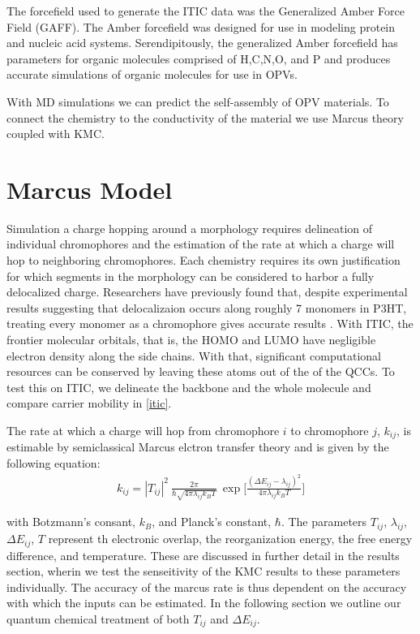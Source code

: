 The forcefield used to generate the ITIC data was the Generalized
Amber Force Field (GAFF)\cite{Wang2004a}.
The Amber forcefield was designed for use in modeling protein and
nucleic acid systems. Serendipitously, the generalized Amber forcefield has parameters for organic molecules
comprised of H,C,N,O, and P and produces accurate simulations of organic molecules for use in OPVs. 

With MD simulations we can predict the self-assembly of OPV materials. To connect the chemistry to the
conductivity of the material we use Marcus theory coupled with KMC.

\section{Marcus Model}
\label{marcusmodel}

Simulation a charge hopping around a morphology requires delineation of
individual chromophores and the estimation of the rate at which a charge will hop to neighboring
chromophores. Each chemistry requires its own justification for which segments in the morphology
can be considered to harbor a fully delocalized charge. Researchers have previously found that, 
despite experimental
results suggesting that delocalizaion occurs along roughly 7 monomers in P3HT, treating every monomer as a
chromophore gives accurate results \cite{jones2017}.
With ITIC, the frontier molecular orbitals, that is, the HOMO
and LUMO have negligible electron density along the side chains. With that, significant computational resources
can be conserved by leaving these atoms out of the of the QCCs. To test this on ITIC, we delineate the
backbone and the whole molecule and compare carrier mobility in \autoref{itic}. 

The rate at which a charge will hop from chromophore $i$ to chromophore $j$, $k_{ij}$,
is estimable by semiclassical Marcus elctron transfer theory and is given by the following equation:
\begin{align}
    k_{ij}  =  |T_{ij}|^2\ \frac{2\pi}{\hbar \sqrt{4 \pi \lambda_{ij} k_{B} T}}\ \exp{\Bigg[ \frac{(\Delta
    E_{ij} - \lambda_{ij})^2}{ 4 \pi \lambda_{ij} k_{B} T} \Bigg] }
    \label{marcus}
\end{align}

with Botzmann's consant, $k_{B}$, and Planck's constant, $\hbar$. The parameters $T_{ij}$, $\lambda_{ij}$,
$\Delta E_{ij}$, $T$ represent th electronic overlap, the reorganization energy, the free energy difference, and
temperature. These are discussed in further detail in the results section, wherin we test the senseitivity of
the KMC results to these parameters individually. 
The accuracy of the marcus rate is thus dependent on the accuracy with which the inputs can be estimated. In
the following section we outline our quantum chemical treatment of both $T_{ij}$ and $\Delta E_{ij}$.

